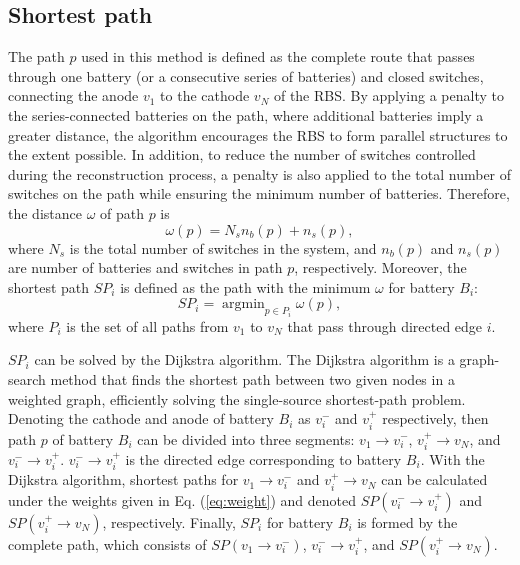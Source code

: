 \documentclass{article}
\providecommand{\DIFadd}[1]{{\protect\color{blue}\uwave{#1}}} %
\providecommand{\DIFaddbegin}{} %
\providecommand{\DIFaddend}{} %
\newcommand{\DIFaddincludegraphics}[2][]{{\color{blue}\fbox{\DIFOincludegraphics[#1]{#2}}}} %
\DeclareRobustCommand{\DIFaddbegin}{\DIFOaddbegin \let\includegraphics\DIFaddincludegraphics} %
\DeclareRobustCommand{\DIFaddend}{\DIFOaddend \let\includegraphics\DIFOincludegraphics} %
\begin{document}
\subsection{Shortest path}

The path $p$ used in this method is defined as the complete route that passes through one battery (or a consecutive series of batteries) and closed switches, connecting the anode $v_1$ to the cathode $v_N$ of the RBS.
By applying a penalty to the series-connected batteries on the path, where additional batteries imply a greater distance, the algorithm encourages the RBS to form parallel structures to the extent possible.
In addition, to reduce the number of switches controlled during the reconstruction process, a penalty is also applied to the total number of switches on the path while ensuring the minimum number of batteries.
Therefore, the distance $\omega$ of path $p$ is  
\begin{equation}\label{eq:weight}
    \omega(p) = N_s  n_b (p) + n_s (p),
\end{equation}
where $N_s$ is the total number of switches in the system, 
and $n_b(p)$ and $n_s(p)$ are \DIFaddbegin \DIFadd{the }\DIFaddend number of batteries and switches in path $p$, respectively. 
Moreover, the shortest path $SP_i$ is defined as the path with the minimum $\omega$ for battery $B_i$:
\begin{equation}\label{eq:def_sp}
    SP_i = \mathop{\arg\min}_{p \in P_i} \omega(p),
\end{equation}
where $P_i$ is the set of all paths from $v_1$ to $v_N$ that pass through directed edge $i$.


$SP_i$ can be solved by the Dijkstra algorithm.
The Dijkstra algorithm is a graph-search method that finds the shortest path between two given nodes in a weighted graph, efficiently solving the single-source shortest-path problem.
Denoting the cathode and anode of battery $B_i$ as $v_i^-$ and $v_i^+$ respectively, then path $p$ of battery $B_i$  can be divided into three segments: $v_1 \rightarrow v_i^-$, $v_i^+ \rightarrow v_N$, and $v_i^- \rightarrow v_i^+$. $v_i^- \rightarrow v_i^+$ is the directed edge corresponding to battery $B_i$. 
With the Dijkstra algorithm, \DIFaddbegin \DIFadd{the }\DIFaddend shortest paths for $v_1 \rightarrow v_i^-$ and $v_i^+ \rightarrow v_N$ can be calculated under the weights given in Eq. (\ref{eq:weight}) and denoted $SP(v_i^- \rightarrow v_i^+)$ and $SP(v_i^+ \rightarrow v_N)$, respectively.
Finally, $SP_i$ for battery $B_i$ is formed by the complete path, which consists of $SP(v_1 \rightarrow v_i^-)$, $v_i^- \rightarrow v_i^+$, and $SP(v_i^+ \rightarrow v_N)$.
\end{document}
